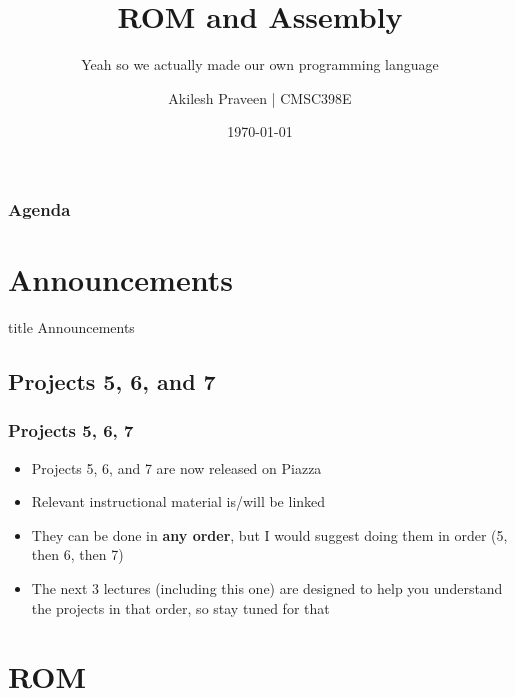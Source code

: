 \documentclass{beamer}
\title{ROM and Assembly}
\subtitle{Yeah so we actually made our own programming language}
\author[CMSC389E]{Akilesh Praveen | CMSC398E}
\institute{UMD}
\date{\today}
\begin{document}
    \begin{frame}
        \titlepage
    \end{frame}
    
    \begin{frame}
        \frametitle{Agenda}
        \tableofcontents
    \end{frame}
    
    \section{Announcements}
    
        \begin{frame}
                \vfill
                \centering
                \begin{beamercolorbox}[sep=8pt,center,shadow=true,rounded=true]{title}
                    Announcements\par%
                \end{beamercolorbox}
                \vfill
             \end{frame}
    
        \subsection{Projects 5, 6, and 7}
        
            
            
            \begin{frame}
                \frametitle{Projects 5, 6, 7}
                \begin{itemize}
                    \item Projects 5, 6, and 7 are now released on Piazza
                    \item Relevant instructional material is/will be linked
                    \item They can be done in \textbf{any order}, but I would suggest doing them in order (5, then 6, then 7)
                    \item The next 3 lectures (including this one) are designed to help you understand the projects in that order, so stay tuned for that
                    
                \end{itemize}
            \end{frame}
            
            
    \section{ROM}
    
\end{document}
